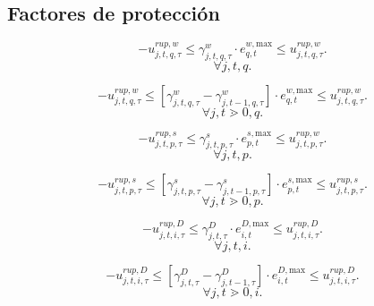 \subsection{Factores de protección}


\begin{equation}
-u^{rup,w}_{j,t,q,\tau} \le \gamma^{w}_{j,t,q,\tau}\cdot e^{w, \text{max}}_{q,t} \le u^{rup,w}_{j,t,q,\tau}.
\end{equation}
\begin{equation*}
    \forall j, t, q.
\end{equation*}

\begin{equation}
-u^{rup,w}_{j,t,q,\tau} \le \left[ \gamma^{w}_{j,t,q,\tau} - \gamma^{w}_{j,t-1,q,\tau} \right ] \cdot e^{w, \text{max}}_{q,t} \le u^{rup,w}_{j,t,q,\tau}.
\end{equation}
\begin{equation*}
    \forall j,t \gtrdot 0,q.
\end{equation*}

\begin{equation}
    -u^{rup,s}_{j,t,p,\tau} \le \gamma^{s}_{j,t,p,\tau}\cdot e^{s, \text{max}}_{p,t} \le u^{rup,w}_{j,t,p,\tau}.
\end{equation}
\begin{equation*}
    \forall j, t, p.
\end{equation*}

\begin{equation}
    -u^{rup,s}_{j,t,p,\tau} \le \left[ \gamma^{s}_{j,t,p,\tau} - \gamma^{s}_{j,t-1,p,\tau} \right ] \cdot e^{s, \text{max}}_{p,t} \le u^{rup,s}_{j,t,p,\tau}.
\end{equation}
\begin{equation*}
    \forall j,t \gtrdot 0,p.
\end{equation*}

\begin{equation}
    -u^{rup,D}_{j,t,i,\tau} \le \gamma^{D}_{j,t,\tau} \cdot e^{D, \text{max}}_{i,t} \le u^{rup,D}_{j,t,i,\tau}.
\end{equation}
\begin{equation*}
    \forall j, t, i.
\end{equation*}

\begin{equation}
    -u^{rup,D}_{j,t,i,\tau} \le \left[ \gamma^{D}_{j,t,\tau} - \gamma^{D}_{j,t-1,\tau} \right ] \cdot e^{D, \text{max}}_{i,t} \le u^{rup,D}_{j,t,i,\tau}.
\end{equation}
\begin{equation*}
    \forall j, t \gtrdot 0 , i.
\end{equation*}


